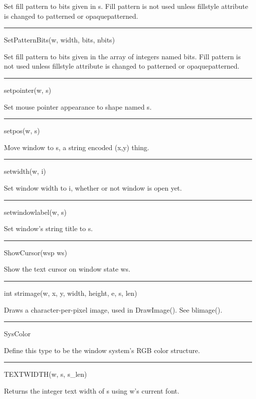 Set fill pattern to bits given in \textsf{s}. Fill pattern is not used
unless fillstyle attribute is changed to
\textsf{{\textquotedbl}patterned{\textquotedbl}} or
\textsf{{\textquotedbl}opaquepatterned{\textquotedbl}}.


\bigskip\hrule\vspace{0.1cm}
\noindent
SetPatternBits(w, width, bits, nbits)


Set fill pattern to bits given in the array of integers named
\textsf{bits}. Fill pattern is not used unless fillstyle attribute is
changed to \textsf{{\textquotedbl}patterned{\textquotedbl}} or
\textsf{{\textquotedbl}opaquepatterned{\textquotedbl}}.


\bigskip\hrule\vspace{0.1cm}
\noindent
setpointer(w, s)


Set mouse pointer appearance to shape named \textsf{s}.


\bigskip\hrule\vspace{0.1cm}
\noindent
setpos(w, s)


Move window to \textsf{s}, a string encoded
{\textquotedbl}(x,y){\textquotedbl} thing.


\bigskip\hrule\vspace{0.1cm}
\noindent
setwidth(w, i)


Set window width to \textsf{i}, whether or not window is open yet.


\bigskip\hrule\vspace{0.1cm}
\noindent
setwindowlabel(w, s)


Set window's string title to \textsf{s}.


\bigskip\hrule\vspace{0.1cm}
\noindent
ShowCursor(wsp ws)


Show the text cursor on window state \textsf{ws}.


\bigskip\hrule\vspace{0.1cm}
\noindent
int strimage(w, x, y, width, height, e, s, len)


Draws a character-per-pixel image, used in \textsf{DrawImage()}. See
\textsf{blimage()}.


\bigskip\hrule\vspace{0.1cm}
\noindent
SysColor


Define this type to be the window system's RGB color structure.


\bigskip\hrule\vspace{0.1cm}
\noindent
TEXTWIDTH(w, s, s\_len)


Returns the integer text width of \textsf{s} using \textsf{w}{}'s current font.


